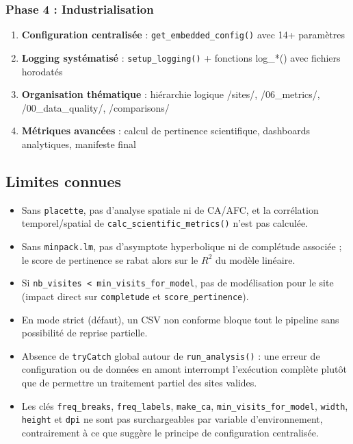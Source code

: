 \documentclass[11pt,a4paper]{article}
\begin{document}
\subsubsection{Phase 4 : Industrialisation}
\begin{enumerate}
  \item \textbf{Configuration centralisée} : \texttt{get\_embedded\_config()} avec 14+ paramètres
  \item \textbf{Logging systématisé} : \texttt{setup\_logging()} + fonctions log\_*() avec fichiers horodatés
  \item \textbf{Organisation thématique} : hiérarchie logique /sites/, /06\_metrics/, /00\_data\_quality/, /comparisons/
  \item \textbf{Métriques avancées} : calcul de pertinence scientifique, dashboards analytiques, manifeste final
\end{enumerate}

\subsection{Limites connues}
\begin{itemize}
  \item Sans \texttt{placette}, pas d'analyse spatiale ni de CA/AFC, et la corrélation temporel/spatial de \texttt{calc\_scientific\_metrics()} n'est pas calculée.
  \item Sans \texttt{minpack.lm}, pas d'asymptote hyperbolique ni de complétude associée ; le score de pertinence se rabat alors sur le $R^2$ du modèle linéaire.
  \item Si \texttt{nb\_visites < min\_visits\_for\_model}, pas de modélisation pour le site (impact direct sur \texttt{completude} et \texttt{score\_pertinence}).
  \item En mode strict (défaut), un CSV non conforme bloque tout le pipeline sans possibilité de reprise partielle.
  \item Absence de \texttt{tryCatch} global autour de \texttt{run\_analysis()} : une erreur de configuration ou de données en amont interrompt l'exécution complète plutôt que de permettre un traitement partiel des sites valides.
  \item Les clés \texttt{freq\_breaks}, \texttt{freq\_labels}, \texttt{make\_ca}, \texttt{min\_visits\_for\_model}, \texttt{width}, \texttt{height} et \texttt{dpi} ne sont pas surchargeables par variable d'environnement, contrairement à ce que suggère le principe de configuration centralisée.
\end{itemize}
\end{document}

